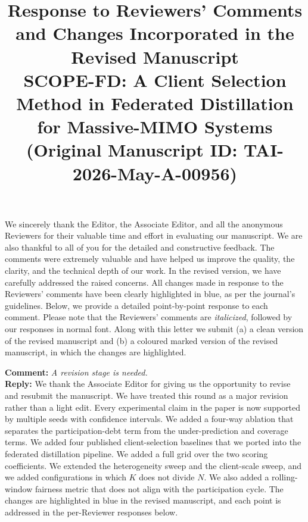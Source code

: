 \documentclass[10pt]{article}
\newcommand{\paperTitle}{SCOPE-FD: A Client Selection Method in Federated Distillation for Massive-MIMO Systems}
\begin{document}
\title{
\small Response to Reviewers' Comments and Changes Incorporated in the Revised Manuscript \\
\vspace{1em}
{\Large \bf \paperTitle} \\
(\textbf{Original Manuscript ID: TAI-2026-May-A-00956})
}
\date{}
\maketitle

\vspace{-3em}

We sincerely thank the Editor, the Associate Editor, and all the anonymous Reviewers for their valuable time and effort in evaluating our manuscript. We are also thankful to all of you for the detailed and constructive feedback. The comments were extremely valuable and have helped us improve the quality, the clarity, and the technical depth of our work. In the revised version, we have carefully addressed the raised concerns. {\color{blue}All changes made in response to the Reviewers' comments have been clearly highlighted in blue, as per the journal's guidelines}. Below, we provide a detailed point-by-point response to each comment. Please note that the Reviewers' comments are \textit{italicized}, followed by our responses in normal font. Along with this letter we submit (a) a clean version of the revised manuscript and (b) a coloured marked version of the revised manuscript, in which the changes are highlighted.\\


\noindent
\textbf{Comment:} \textit{A revision stage is needed.}\\
\noindent
\textbf{Reply:} {We thank the Associate Editor for giving us the opportunity to revise and resubmit the manuscript. We have treated this round as a major revision rather than a light edit. Every experimental claim in the paper is now supported by multiple seeds with confidence intervals. We added a four-way ablation that separates the participation-debt term from the under-prediction and coverage terms. We added four published client-selection baselines that we ported into the federated distillation pipeline. We added a full grid over the two scoring coefficients. We extended the heterogeneity sweep and the client-scale sweep, and we added configurations in which $K$ does not divide $N$. We also added a rolling-window fairness metric that does not align with the participation cycle. The changes are highlighted in blue in the revised manuscript, and each point is addressed in the per-Reviewer responses below.}\\
\end{document}
